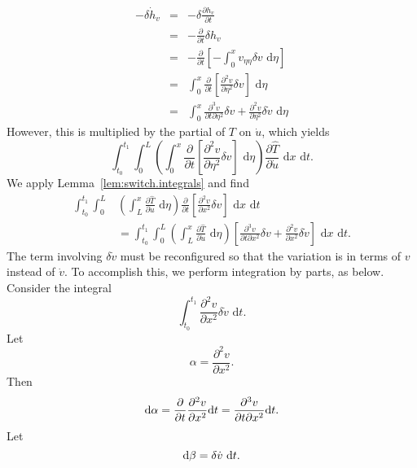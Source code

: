 \begin{eqnarray}
-\delta\dot h_v &=& -\delta \frac{\partial h_v}{\partial t} \\
 &=& -\frac{\partial}{\partial t}\delta h_v\\
 &=& -\frac{\partial}{\partial t}\left[-\int_0^xv_{\eta\eta}\delta v\text{ d}\eta\right] \\
 &=& \int_0^x\frac{\partial}{\partial t}\left[\frac{\partial^2v}{\partial\eta^2}\delta v\right]\text{ d}\eta\\
 &=& \int_0^x\frac{\partial^3 v}{\partial t\partial\eta^2}\delta v+\frac{\partial^2 v}{\partial \eta^2}\delta\dot v\text{ d}\eta
\end{eqnarray}
However, this is multiplied by the partial of $T$ on $\dot u$, which yields
\begin{equation}
\int_{t_0}^{t_1}\int_0^L\left(\int_0^x\frac{\partial}{\partial t}\left[\frac{\partial^2v}{\partial\eta^2}\delta v\right]\text{ d}\eta\right)\frac{\partial \hat T}{\partial \dot u}\text{ d}x\text{ d}t.
\end{equation}
We apply Lemma~\ref{lem:switch.integrals} and find
\begin{align}
 \int_{t_0}^{t_1} \int_0^L & \left(\int_L^x\frac{\partial\hat T}{\partial \dot u}\text{ d}\eta\right)\frac{\partial}{\partial t}\left[\frac{\partial^2v}{\partial x^2}\delta v\right]\text{ d}x\text{ d}t \label{eq:lemma_switch_vdot}\\
&= \int_{t_0}^{t_1}\int_0^L\left(\int_L^x\frac{\partial\hat T}{\partial \dot u}\text{ d}\eta\right)\left[\frac{\partial^3v}{\partial t\partial x^2}\delta v+\frac{\partial^2 v}{\partial x^2}\delta\dot v\right]\text{ d}x\text{ d}t. \nonumber
\end{align}
The term involving $\delta \dot v$ must be reconfigured so that the variation is in terms of $v$ instead of $\dot v$. To accomplish this, we perform integration by parts, as below.
Consider the integral
\begin{equation}
\int_{t_0}^{t_1}\frac{\partial^2 v}{\partial x^2}\delta \dot v\text{ d}t.
\end{equation}
Let
\begin{equation}
\alpha = \frac{\partial^2 v}{\partial x^2}.
\end{equation}
Then
\begin{equation}
\text d\alpha = \frac{\partial}{\partial t}\frac{\partial^2 v}{\partial x^2}\text dt = \frac{\partial^3 v}{\partial t\partial x^2}\text dt.
\end{equation}
Let
\begin{equation}
\text d\beta = \delta\dot v\text{ d}t.
\end{equation}
